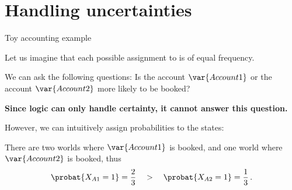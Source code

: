 \documentclass{beamer}
\begin{document}
    {\frame[plain]{\titlepage}}
    \showoutlineatsection


    \section{Handling uncertainties}


    \begin{frame}{Toy accounting example}

        Let us imagine that each possible assignment to is of equal frequency.


        We can ask the following questions:
        Is the account $\var{Account 1}$ or the account $\var{Account 2}$ more likely to be booked?

        \begin{center}
            \bf Since logic can only handle certainty, it cannot answer this question.
        \end{center}

        However, we can intuitively assign probabilities to the states:

        There are two worlds where $\var{Account 1}$ is booked, and one world where $\var{Account 2}$ is booked, thus
        \begin{align*}
            \probat{\catvariableof{A1}=1} = \frac{2}{3} \quad > \quad   \probat{\catvariableof{A2}=1} = \frac{1}{3} \, .
        \end{align*}


    \end{frame}
\end{document}
